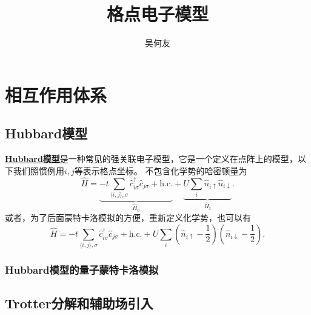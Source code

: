 \documentclass[hyperref, UTF8, a4paper]{ctexart}
\title{格点电子模型}
\author{吴何友}
\newcommand*{\pair}[1]{\langle #1 \rangle}
\newcommand*{\concept}[1]{\underline{\textbf{#1}}}
\begin{document}
\maketitle

\section{相互作用体系}

\subsection{Hubbard模型}

\concept{Hubbard模型}是一种常见的强关联电子模型，它是一个定义在点阵上的模型，以下我们照惯例用$i, j$等表示格点坐标。
不包含化学势的哈密顿量为
\begin{equation}
    \hat{H} = \underbrace{-t \sum_{\pair{i, j}, \sigma} \hat{c}_{i\sigma}^\dagger \hat{c}_{j\sigma} + \text{h.c.}}_{\hat{H}_0} + \underbrace{U \sum_i \hat{n}_{i \uparrow} \hat{n}_{i \downarrow}}_{\hat{H}_\text{I}}.
\end{equation}
或者，为了后面蒙特卡洛模拟的方便，重新定义化学势，也可以有
\begin{equation}
    \hat{H} = -t \sum_{\pair{i, j}, \sigma} \hat{c}_{i\sigma}^\dagger \hat{c}_{j\sigma} + \text{h.c.} 
    + U \sum_i \left(\hat{n}_{i\uparrow} - \frac{1}{2}\right) \left(\hat{n}_{i\downarrow} - \frac{1}{2}\right).
\end{equation}

\subsubsection{Hubbard模型的量子蒙特卡洛模拟}

\subsection{Trotter分解和辅助场引入}
\end{document}
